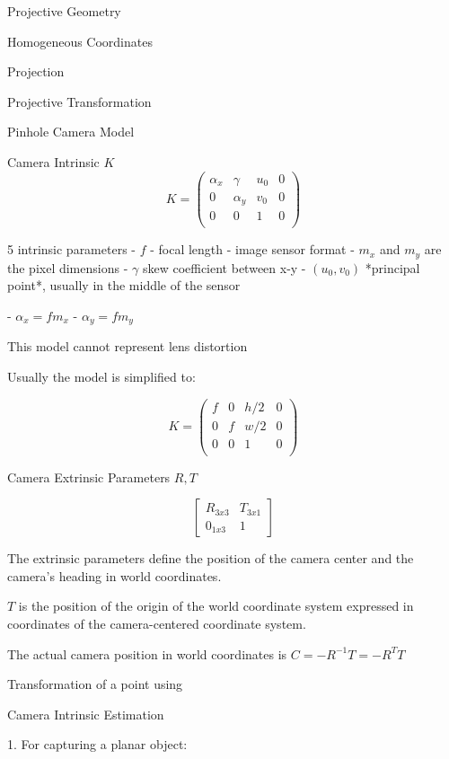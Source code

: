 \begin{section}
\begin{subsubsection}
\begin{subsubsection}
\begin{subsubsection}
\begin{section}{Projective Geometry}
\begin{subsection}{Homogeneous Coordinates}
\begin{subsubsection}
{\begin{subsubsection}{Projection}
\begin{subsubsection}{Projective Transformation}
\begin{subsection}
\begin{subsubsection}
\begin{subsubsection}
\begin{subsubsection}
{\begin{subsubsection}
\begin{subsection}
\begin{subsection} {Pinhole Camera Model}
\begin{subsection} {Camera Intrinsic $K$}
$$ K = \left( \begin{matrix} 
\alpha_x & \gamma & u_0 & 0 \\
0 & \alpha_y  & v_0 & 0 \\
0 & 0 &  1 & 0 \\
\end{matrix}
\right) $$

5 intrinsic parameters
- $f$ - focal length
- image sensor format - $m_x$ and $m_y$ are the pixel dimensions
- $\gamma$ skew coefficient between x-y
- $(u_0,v_0)$ *principal point*, usually in the middle of the sensor

- $\alpha_x = f m_x $
- $\alpha_y = f m_y $

This model cannot represent lens distortion

Usually the model is simplified to:

$$ K = \left( \begin{matrix} 
f & 0 & h/2 & 0 \\
0 & f  & w/2 & 0 \\
0 & 0 &  1 & 0 \\
\end{matrix}
\right) $$

\begin{subsection} Camera Extrinsic Parameters $R,T$

$$ \left[ \begin{matrix} 
R_{3x3} & T_{3x1} \\
0_{1x3} & 1 \end{matrix}
\right] $$

The extrinsic parameters define the position of the camera center and the camera's heading in world coordinates. 

$T$ is the position of the origin of the world coordinate system expressed in coordinates of the camera-centered coordinate system. 

The actual camera position in world coordinates is $C = -R^{-1}T=-R^{T}T $

Transformation of a point using 

\begin{subsection} Camera Intrinsic Estimation


1. For capturing a planar object:


\end{subsection}
\end{subsection}
\end{subsection}
\end{subsection}
\end{subsection}
\end{subsubsection}}
\end{subsubsection}
\end{subsubsection}
\end{subsubsection}
\end{subsection}
\end{subsubsection}
\end{subsubsection}}
\end{subsubsection}
\end{subsection}
\end{section}
\end{subsubsection}
\end{subsubsection}
\end{subsubsection}
\end{section}
